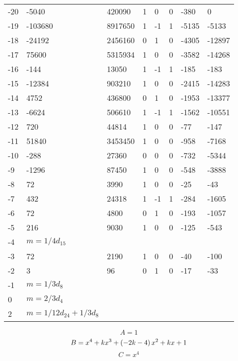 \documentclass{amsart}
\begin{document}
\begin{longtable}{|l|l|l|lllll|}
-20&-5040&420090&1&0&0&-380&0\\
-19&-103680&8917650&1&-1&1&-5135&-5133\\
-18&-24192&2456160&0&1&0&-4305&-12897\\
-17&75600&5315934&1&0&0&-3582&-14268\\
-16&-144&13050&1&-1&1&-185&-183\\
-15&-12384&903210&1&0&0&-2415&-14283\\
-14&4752&436800&0&1&0&-1953&-13377\\
-13&-6624&506610&1&-1&1&-1562&-10551\\
-12&720&44814&1&0&0&-77&-147\\
-11&51840&3453450&1&0&0&-958&-7168\\
-10&-288&27360&0&0&0&-732&-5344\\
-9&-1296&87450&1&0&0&-548&-3888\\
-8&72&3990&1&0&0&-25&-43\\
-7&432&24318&1&-1&1&-284&-1605\\
-6&72&4800&0&1&0&-193&-1057\\
-5&216&9030&1&0&0&-125&-543\\
-4&$m=1/4d_{15}$&&\multicolumn{5}{c|}{}\\
-3&72&2190&1&0&0&-40&-100\\
-2&3&96&0&1&0&-17&-33\\
-1&$m=1/3d_{8}$&&\multicolumn{5}{c|}{}\\
0&$m=2/3d_{4}$&&\multicolumn{5}{c|}{}\\
2&$m=1/12d_{24}+1/3d_{8}$&&\multicolumn{5}{c|}{}\\
\hline
\end{longtable}
$$A=1$$
$$B=x^4
 + k\*x^3
 + \left(-2\*k
 - 4\right) \*x^2
 + k\*x
 + 1$$
$$C=x^4$$
\end{document}
